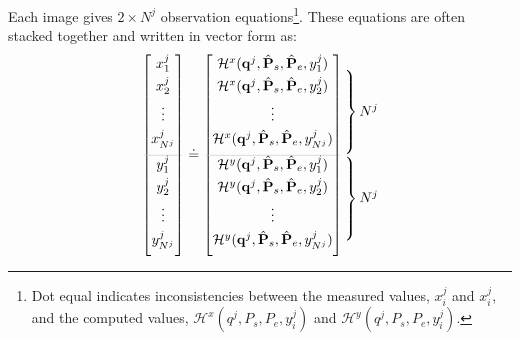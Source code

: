 \clearpage
Each image gives $2\times N^j$ observation equations\footnote{Dot equal indicates inconsistencies between the measured values, $x^j_i$ and $x^j_i$, and the computed values, $\mathcal{H}^x(q^j,P_s,P_e,y^j_i)$ and $\mathcal{H}^y(q^j,P_s,P_e,y^j_i)$.}. These equations are often stacked together and written in vector form as:
\begin{equation} \label{eq:Ffunction}
\begin{bmatrix}
 x^j_1\\[0.3em]
 x^j_2\\[0.3em]
 \vdots\\[0.3em]
 x^j_{N^j}\\[0.5em]
 \arrayrulecolor{lightgray} \hline
 y^j_1\\[0.3em]
 y^j_2\\[0.3em]
 \vdots\\[0.3em]
 y^j_{N^j}\\[0.5em]
\end{bmatrix}
\doteq
\begin{bmatrix}
 \mathcal{H}^x(\mathbf{q}^j,\hat{\mathbf{P}}_s,\hat{\mathbf{P}}_e,y^j_{1})\\[0.3em]
 \mathcal{H}^x(\mathbf{q}^j,\hat{\mathbf{P}}_s,\hat{\mathbf{P}}_e,y^j_{2})\\[0.3em]
 \vdots\\[0.3em]
 \mathcal{H}^x(\mathbf{q}^j,\hat{\mathbf{P}}_s,\hat{\mathbf{P}}_e,y^j_{N^j})\\[0.5em]
 \arrayrulecolor{lightgray} \hline
 \mathcal{H}^y(\mathbf{q}^j,\hat{\mathbf{P}}_s,\hat{\mathbf{P}}_e,y^j_{1})\\[0.3em]
 \mathcal{H}^y(\mathbf{q}^j,\hat{\mathbf{P}}_s,\hat{\mathbf{P}}_e,y^j_{2})\\[0.3em]
 \vdots\\[0.3em]
 \mathcal{H}^y(\mathbf{q}^j,\hat{\mathbf{P}}_s,\hat{\mathbf{P}}_e,y^j_{N^j})\\[0.5em]
\end{bmatrix}
\begin{array}{@{\kern-\nulldelimiterspace}l@{}}
 \left.\begin{array}{@{}c@{}}\\[0.3em] \\[0.3em] \\[0.3em] \\[0.5em] \end{array}\right\} N^j\\
 \left.\begin{array}{@{}c@{}}\\[0.3em] \\[0.3em] \\[0.3em] \\[0.5em] \end{array}\right\} N^j\\
\end{array}
\end{equation}

